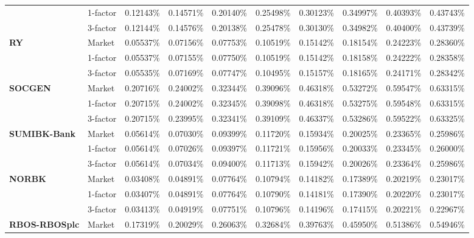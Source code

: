 \documentclass[12pt,a4paper]{article}
\theoremstyle{plain}
\numberwithin{equation}{section}
\begin{document}
\begin{table}[t]
{\begin{tabular}{|rl|cccccccc|}
          & 1-factor & 0.12143\% & 0.14571\% & 0.20140\% & 0.25498\% & 0.30123\% & 0.34997\% & 0.40393\% & 0.43743\% \\
          & 3-factor & 0.12144\% & 0.14576\% & 0.20138\% & 0.25478\% & 0.30130\% & 0.34982\% & 0.40400\% & 0.43739\% \\
    \midrule
    \midrule
    \multicolumn{1}{|l}{\textbf{RY}} & Market & 0.05537\% & 0.07156\% & 0.07753\% & 0.10519\% & 0.15142\% & 0.18154\% & 0.24223\% & 0.28360\% \\
          & 1-factor & 0.05537\% & 0.07155\% & 0.07750\% & 0.10519\% & 0.15142\% & 0.18158\% & 0.24222\% & 0.28358\% \\
          & 3-factor & 0.05535\% & 0.07169\% & 0.07747\% & 0.10495\% & 0.15157\% & 0.18165\% & 0.24171\% & 0.28342\% \\
    \midrule
    \midrule
    \multicolumn{1}{|l}{\textbf{SOCGEN}} & Market & 0.20716\% & 0.24002\% & 0.32344\% & 0.39096\% & 0.46318\% & 0.53272\% & 0.59547\% & 0.63315\% \\
\cmidrule{3-10}          & 1-factor & 0.20715\% & 0.24002\% & 0.32345\% & 0.39098\% & 0.46318\% & 0.53275\% & 0.59548\% & 0.63315\% \\
          & 3-factor & 0.20715\% & 0.23995\% & 0.32341\% & 0.39109\% & 0.46337\% & 0.53286\% & 0.59522\% & 0.63325\% \\
    \midrule
    \midrule
    \multicolumn{1}{|l}{\textbf{SUMIBK-Bank}} & Market & 0.05614\% & 0.07030\% & 0.09399\% & 0.11720\% & 0.15934\% & 0.20025\% & 0.23365\% & 0.25986\% \\
\cmidrule{3-10}          & 1-factor & 0.05614\% & 0.07026\% & 0.09397\% & 0.11721\% & 0.15956\% & 0.20033\% & 0.23345\% & 0.26000\% \\
          & 3-factor & 0.05614\% & 0.07034\% & 0.09400\% & 0.11713\% & 0.15942\% & 0.20026\% & 0.23364\% & 0.25986\% \\
    \midrule
    \midrule
    \multicolumn{1}{|l}{\textbf{NORBK}} & Market & 0.03408\% & 0.04891\% & 0.07764\% & 0.10794\% & 0.14182\% & 0.17389\% & 0.20219\% & 0.23017\% \\
\cmidrule{3-10}          & 1-factor & 0.03407\% & 0.04891\% & 0.07764\% & 0.10790\% & 0.14181\% & 0.17390\% & 0.20220\% & 0.23017\% \\
          & 3-factor & 0.03413\% & 0.04919\% & 0.07751\% & 0.10796\% & 0.14196\% & 0.17415\% & 0.20221\% & 0.22967\% \\
    \midrule
    \midrule
    \multicolumn{1}{|l}{\textbf{RBOS-RBOSplc}} & Market & 0.17319\% & 0.20029\% & 0.26063\% & 0.32684\% & 0.39763\% & 0.45950\% & 0.51386\% & 0.54946\% \\

\end{tabular}}
\end{table}
\end{document}
